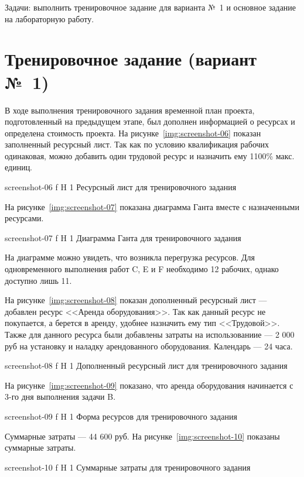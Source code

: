 \documentclass{bmstu}
\begin{document}
Задачи: выполнить тренировочное задание для варианта №~1 и основное задание на лабораторную работу.

\section{Тренировочное задание (вариант №~1)}

В ходе выполнения тренировочного задания временной план проекта, подготовленный на предыдущем этапе, был дополнен информацией о ресурсах и определена стоимость проекта. 
На рисунке~\ref{img:screenshot-06} показан заполненный ресурсный лист. 
Так как по условию квалификация рабочих одинаковая, можно добавить один трудовой ресурс и назначить ему 1100\% макс. единиц.
    
    {screenshot-06}
    {f}
    {H}
    {1\textwidth}
    {Ресурсный лист для тренировочного задания}
    
На рисунке~\ref{img:screenshot-07} показана диаграмма Ганта вместе с назначенными ресурсами.
    
    {screenshot-07}
    {f}
    {H}
    {1\textwidth}
    {Диаграмма Ганта для тренировочного задания}
    
На диаграмме можно увидеть, что возникла перегрузка ресурсов. 
Для одновременного выполнения работ C, E и F необходимо 12 рабочих, однако доступно лишь 11.
    
На рисунке~\ref{img:screenshot-08} показан дополненный ресурсный лист --- добавлен ресурс <<Аренда оборудования>>. 
Так как данный ресурс не покупается, а берется в аренду, удобнее назначить ему тип <<Трудовой>>. 
Также для данного ресурса были добавлены затраты на использованиие --- 2 000 руб на установку и наладку арендованного оборудования. 
Календарь --- 24 часа.
    
    {screenshot-08}
    {f}
    {H}
    {1\textwidth}
    {Дополненный ресурсный лист для тренировочного задания}
    
На рисунке~\ref{img:screenshot-09} показано, что аренда оборудования начинается с 3-го дня выполнения задачи B.
    
    {screenshot-09}
    {f}
    {H}
    {1\textwidth}
    {Форма ресурсов для тренировочного задания}
    
Суммарные затраты --- 44 600 руб. 
На рисунке~\ref{img:screenshot-10} показаны суммарные затраты.
    
    {screenshot-10}
    {f}
    {H}
    {1\textwidth}
    {Суммарные затраты для тренировочного задания}
    
\end{document}
